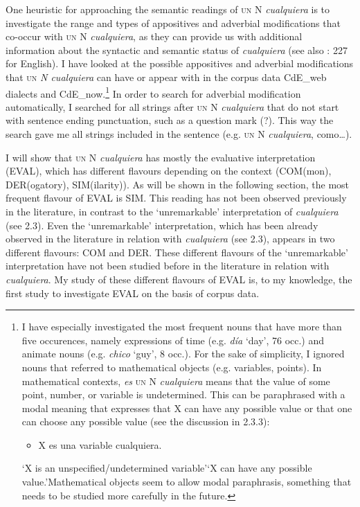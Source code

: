 \documentclass[output=paper]{langscibook}
\begin{document}
One heuristic for approaching the semantic readings of \textsc{un} N \textit{cualquiera} is to investigate the range and types of appositives and adverbial modifications that co-occur with \textsc{un} N \textit{cualquiera}, as they can provide us with additional information about the syntactic and semantic status of \textit{cualquiera} (see also \citealt{Condoravdi2015}: 227 for English). I have looked at the possible appositives and adverbial modifications that \textsc{un} \textit{N cualquiera} can have or appear with in the corpus data CdE\_web dialects and CdE\_now.\footnote{ \textrm{I have especially investigated the most frequent nouns that have more than five occurences, namely expressions of time (e.g.} \textrm{\textit{día}} \textrm{‘day’, 76 occ.) and animate nouns (e.g.} \textrm{\textit{chico}} \textrm{‘guy’, 8 occ.). For the sake of simplicity, I ignored nouns that referred to mathematical objects (e.g. variables, points). In mathematical contexts,} \textrm{\textit{es} }\textsc{un} \textrm{N}\textrm{ \textit{cualquiera}} \textrm{means that the value of some point, number, or variable is undetermined. This can be paraphrased with a modal meaning that expresses that X can have any possible value or that one can choose any possible value (see the discussion in 2.3.3):}

\begin{itemize}
\item \begin{styleFootnote}
\textrm{X es una variable cualquiera.}
\end{styleFootnote}
\end{itemize}
\textrm{‘X is an unspecified/undetermined variable’}\textrm{‘X can have any possible value.’}\textrm{Mathematical objects seem to allow modal paraphrasis, something that needs to be studied more carefully in the future.}} In order to search for adverbial modification automatically, I searched for all strings after \textsc{un} N \textit{cualquiera} that do not start with sentence ending punctuation, such as a question mark (?). This way the search gave me all strings included in the sentence (e.g. \textsc{un} N \textit{cualquiera}, como…).

  I will show that \textsc{un} N \textit{cualquiera} has mostly the evaluative interpretation (EVAL), which has different flavours depending on the context (COM(mon), DER(ogatory), SIM(ilarity)). As will be shown in the following section, the most frequent flavour of EVAL is SIM. This reading has not been observed previously in the literature, in contrast to the ‘unremarkable’ interpretation of \textit{cualquiera} (see 2.3). Even the ‘unremarkable’ interpretation, which has been already observed in the literature in relation with \textit{cualquiera} (see 2.3), appears in two different flavours: COM and DER. These different flavours of the ‘unremarkable’ interpretation have not been studied before in the literature in relation with \textit{cualquiera}. My study of these different flavours of EVAL is, to my knowledge, the first study to investigate EVAL on the basis of corpus data.
\end{document}
